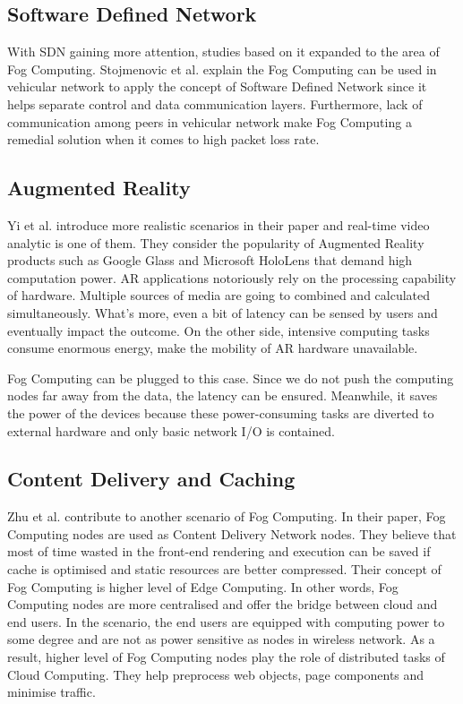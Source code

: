 \subsection{Software Defined Network}
With SDN gaining more attention, studies based on it expanded to the area of Fog Computing. Stojmenovic et al. explain the Fog Computing can be used in vehicular network to apply the concept of Software Defined Network since it helps separate control and data communication layers. Furthermore, lack of communication among peers in vehicular network make Fog Computing a remedial solution when it comes to high packet loss rate.\cite{stojmenovic2014fog} 

\subsection{Augmented Reality}
Yi et al.\cite{yi2015survey} introduce more realistic scenarios in their paper and real-time video analytic is one of them. They consider the popularity of Augmented Reality products such as Google Glass and Microsoft HoloLens that demand high computation power. AR applications notoriously rely on the processing capability of hardware. Multiple sources of media are going to combined and calculated simultaneously. What's more, even a bit of latency can be sensed by users and eventually impact the outcome. On the other side, intensive computing tasks consume enormous energy, make the mobility of AR hardware unavailable. 

Fog Computing can be plugged to this case. Since we do not push the computing nodes far away from the data, the latency can be ensured. Meanwhile, it saves the power of the devices because these power-consuming tasks are diverted to external hardware and only basic network I/O is contained.

\subsection{Content Delivery and Caching}
Zhu et al. contribute to another scenario of Fog Computing. In their paper, Fog Computing nodes are used as Content Delivery Network nodes. They believe that most of time wasted in the front-end rendering and execution can be saved if cache is optimised and static resources are better compressed. Their concept of Fog Computing is higher level of Edge Computing. In other words, Fog Computing nodes are more centralised and offer the bridge between cloud and end users. In the scenario, the end users are equipped with computing power to some degree and are not as power sensitive as nodes in wireless network. As a result, higher level of Fog Computing nodes play the role of distributed tasks of Cloud Computing. They help preprocess web objects, page components and minimise traffic.


